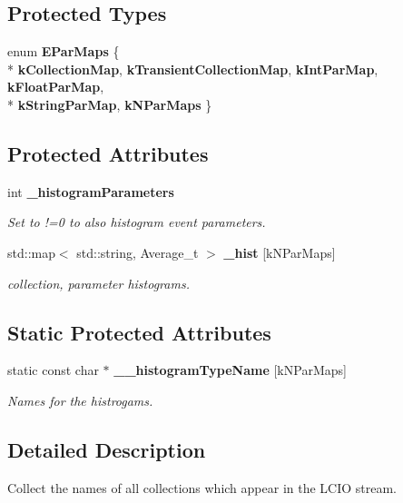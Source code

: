 \subsection*{Protected Types}
\begin{DoxyCompactItemize}
\item 
enum {\bf E\-Par\-Maps} \{ \\*
{\bf k\-Collection\-Map}, 
{\bf k\-Transient\-Collection\-Map}, 
{\bf k\-Int\-Par\-Map}, 
{\bf k\-Float\-Par\-Map}, 
\\*
{\bf k\-String\-Par\-Map}, 
{\bfseries k\-N\-Par\-Maps}
 \}
\end{DoxyCompactItemize}
\subsection*{Protected Attributes}
\begin{DoxyCompactItemize}
\item 
int {\bf \-\_\-histogram\-Parameters}
\begin{DoxyCompactList}\small\item\em Set to !=0 to also histogram event parameters. \end{DoxyCompactList}\item 
std\-::map$<$ std\-::string, Average\-\_\-t $>$ {\bf \-\_\-hist} [k\-N\-Par\-Maps]
\begin{DoxyCompactList}\small\item\em collection, parameter histograms. \end{DoxyCompactList}\end{DoxyCompactItemize}
\subsection*{Static Protected Attributes}
\begin{DoxyCompactItemize}
\item 
static const char $\ast$ {\bf \-\_\-\-\_\-histogram\-Type\-Name} [k\-N\-Par\-Maps]
\begin{DoxyCompactList}\small\item\em Names for the histrogams. \end{DoxyCompactList}\end{DoxyCompactItemize}


\subsection{Detailed Description}
Collect the names of all collections which appear in the L\-C\-I\-O stream. 

